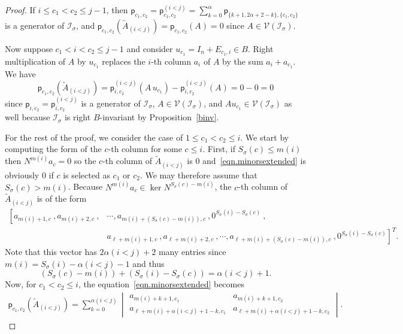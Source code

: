 \documentclass[11pt]{amsart}
\theoremstyle{remark}
\theoremstyle{remark}
\theoremstyle{definition}
\theoremstyle{definition}
\theoremstyle{definition}
\numberwithin{equation}{section}
\renewcommand{\ker}{\operatorname{ker }}
\newcommand{\gs}{\sigma}
\newcommand{\ci}{\mathcal{I}}
\newcommand{\cv}{\mathcal{V}}
\newcommand{\al}{\alpha}
\newcommand{\pl}{\mathsf{p}}
\newcommand{\isigma}{\ci_\gs}
\newcommand{\mi}[1]{m(#1)}
\begin{document}
\begin{proof}
If $i\leq c_1<c_2\leq j-1$, then $\pl_{c_1, c_2} = \pl_{c_1, c_2}^{(i<j)}=\sum_{k=0}^{\al}\pl_{\{k+1, 2\al+2-k\}, \{c_1,c_2\}}$ is a generator of $\ci_\gs$, and $\pl_{c_1, c_2}\left(\widetilde A_{(i<j)}\right) = \pl_{c_1, c_2}\left(A\right)=0$ since $A\in \cv(\ci_\gs)$. 

Now suppose $c_1< i <c_2\leq j-1$ and consider $u_{c_1} = I_n + E_{c_1, i} \in B$. Right multiplication of $A$ by $u_{c_1}$ replaces the $i$-th column $a_i$ of $A$ by the sum $a_i+a_{c_1}$. We have 
\[
\pl_{c_1,c_2}\left(\widetilde A_{(i<j)}\right) =  \pl_{i,c_2}^{(i<j)}\left(A\, u_{c_1}\right) -  \pl_{i,c_2}^{(i<j)}\left(A\right)=0-0=0
\]
since $\pl_{i,c_2} = \pl_{i,c_2}^{(i<j)}$ is a generator of $\ci_\gs$, $A\in \cv(\isigma)$, and $Au_{c_1}\in \cv(\ci_\gs)$ as well because $\ci_\gs$ is right $B$-invariant by Proposition~\ref{binv}.


For the rest of the proof, we consider the case of $1\leq c_1<c_2\leq i$.  We start by computing the form of the $c$-th column for some $c\leq i$. First, if $S_\gs(c) \leq \mi{i}$ then $N^{\mi{i}}a_{c} =0$ so the $c$-th column of $\widetilde A_{(i<j)}$ is $0$ and~\eqref{eqn.minorsextended} is obviously $0$ if $c$ is selected as $c_1$ or $c_2$. We may therefore assume that $S_\gs(c) > \mi{i}$. Because $N^{\mi{i}} a_{c}\in \ker N^{S_\gs(c) - \mi{i}}$, the $c$-th column of $\widetilde A_{(i<j)}$ is of the form 
\begin{align} \label{eqn.colform}
\left[ a_{\mi{i}+1, c}\  \right.,  a_{m(i)+2, c}\ , &\cdots ,  a_{\mi{i}+(S_\gs(c)-\mi{i}), c}\ , 0^{S_\gs(i) - S_\gs(c)} \ ,   \\  
\nonumber &  a_{\ell+\mi{i}+1, c} \ ,    a_{\ell + m(i)+2, c}\ , \cdots , a_{\ell + \mi{i}+(S_\gs(c)-\mi{i}), c}\ ,\left. 0^{S_\gs(i) - S_\gs(c)}  \right]^T.
\end{align}
Note that this vector has $2\al(i<j)+2$ many entries since $\mi{i} = S_\gs(i)-\alpha(i<j)-1$ and thus 
\[
(S_\gs(c)-\mi{i}) + (S_\gs(i) -  S_{\gs}(c) )  =  \alpha(i<j)+1.
\]
Now, for $c_1<c_2\leq i$, the equation~\eqref{eqn.minorsextended} becomes
\begin{eqnarray}\label{eqn.minorsextended2}
\pl_{c_1,c_2}\left(\widetilde A_{(i<j)}\right) = \sum_{k=0}^{\al(i<j)} \begin{vmatrix} a_{\mi{i}+k+1, c_1} & a_{\mi{i}+k+1, c_2}\\ a_{\ell+\mi{i}+\al(i<j) +1 - k, c_1} & a_{\ell+\mi{i}+\al(i<j) +1 - k, c_2}  \end{vmatrix} .
\end{eqnarray}



\end{proof}
\end{document}
